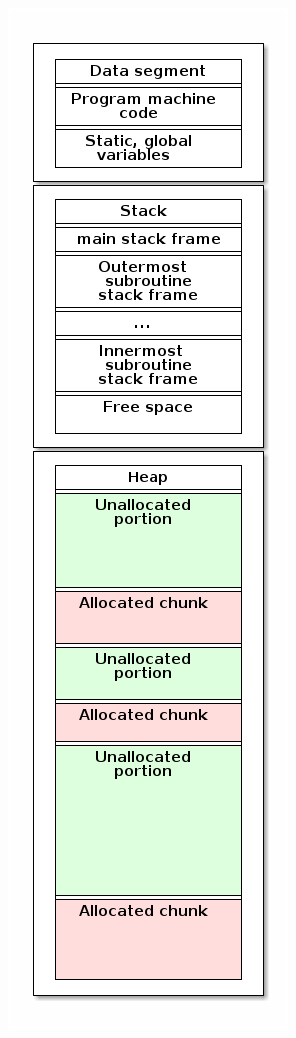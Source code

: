 \documentclass[11pt]{article}
\theoremstyle{definition}
\begin{document}
\begin{center}
\includegraphics[width=\textwidth]{media/data-segment-stack-heap.png}
\end{center}
\end{document}
